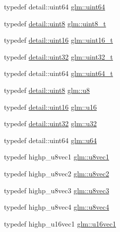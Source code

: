 \begin{DoxyCompactItemize}
\item 
typedef detail\+::uint64 \hyperlink{group__gtc__type__precision_gae3632bf9b37da66233d78930dd06378a}{glm\+::uint64}
\item 
typedef \hyperlink{stb__image_8c_adde6aaee8457bee49c2a92621fe22b79}{detail\+::uint8} \hyperlink{group__gtc__type__precision_ga93adf6dd9803408f3e3aaf9dedda352b}{glm\+::uint8\+\_\+t}
\item 
typedef \hyperlink{stb__image_8c_a05f6b0ae8f6a6e135b0e290c25fe0e4e}{detail\+::uint16} \hyperlink{group__gtc__type__precision_gac4eb4f43cae8129b00086dc234d3b8fc}{glm\+::uint16\+\_\+t}
\item 
typedef \hyperlink{stb__image_8c_a1134b580f8da4de94ca6b1de4d37975e}{detail\+::uint32} \hyperlink{group__gtc__type__precision_ga822ca53a9ad412504532838906276a99}{glm\+::uint32\+\_\+t}
\item 
typedef detail\+::uint64 \hyperlink{group__gtc__type__precision_ga058f57c19e1befdcf12498944bd73e69}{glm\+::uint64\+\_\+t}
\item 
typedef \hyperlink{stb__image_8c_adde6aaee8457bee49c2a92621fe22b79}{detail\+::uint8} \hyperlink{group__gtc__type__precision_ga5e3dc67373d5068997d2d9f41c9024d2}{glm\+::u8}
\item 
typedef \hyperlink{stb__image_8c_a05f6b0ae8f6a6e135b0e290c25fe0e4e}{detail\+::uint16} \hyperlink{group__gtc__type__precision_gae7a1571503f83d2264ddfa705a6b082a}{glm\+::u16}
\item 
typedef \hyperlink{stb__image_8c_a1134b580f8da4de94ca6b1de4d37975e}{detail\+::uint32} \hyperlink{group__gtc__type__precision_ga54e837745059fd29017bed71cfa0a8db}{glm\+::u32}
\item 
typedef detail\+::uint64 \hyperlink{group__gtc__type__precision_ga71cedd4972f9cb1a5e14dfe5ab83ecd7}{glm\+::u64}
\item 
typedef highp\+\_\+u8vec1 \hyperlink{group__gtc__type__precision_ga024be724ff45865952190522b03fc0d5}{glm\+::u8vec1}
\item 
typedef highp\+\_\+u8vec2 \hyperlink{group__gtc__type__precision_ga1c259b876f8757eb197b83a5fab476f0}{glm\+::u8vec2}
\item 
typedef highp\+\_\+u8vec3 \hyperlink{group__gtc__type__precision_ga8262aeb120701de1b57773eb10be0f35}{glm\+::u8vec3}
\item 
typedef highp\+\_\+u8vec4 \hyperlink{group__gtc__type__precision_gaf3c840b8a90a194559121504ba599197}{glm\+::u8vec4}
\item 
typedef highp\+\_\+u16vec1 \hyperlink{group__gtc__type__precision_ga809cb55e5fed3456686aae96e7e8684c}{glm\+::u16vec1}

\end{DoxyCompactItemize}
